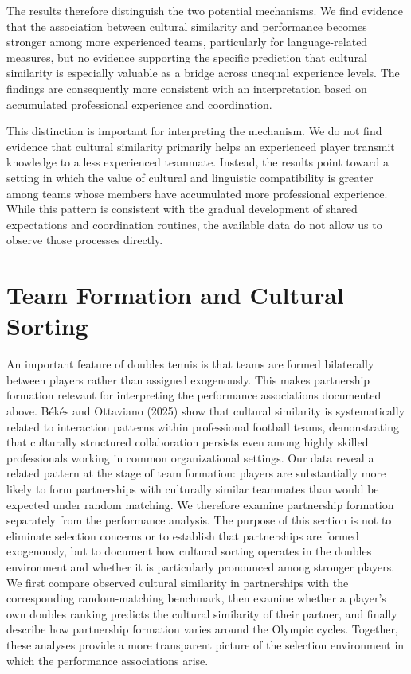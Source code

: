 \documentclass[10pt]{article}
\begin{document}
The results therefore distinguish the two potential mechanisms. We find evidence that the association between cultural similarity and performance becomes stronger among more experienced teams, particularly for language-related measures, but no evidence supporting the specific prediction that cultural similarity is especially valuable as a bridge across unequal experience levels. The findings are consequently more consistent with an interpretation based on accumulated professional experience and coordination.

This distinction is important for interpreting the mechanism. We do not find evidence that cultural similarity primarily helps an experienced player transmit knowledge to a less experienced teammate. Instead, the results point toward a setting in which the value of cultural and linguistic compatibility is greater among teams whose members have accumulated more professional experience. While this pattern is consistent with the gradual development of shared expectations and coordination routines, the available data do not allow us to observe those processes directly.



\section{Team Formation and Cultural Sorting}
An important feature of doubles tennis is that teams are formed bilaterally between players rather than assigned exogenously. This makes partnership formation relevant for interpreting the performance associations documented above. Békés and Ottaviano (2025) show that cultural similarity is systematically related to interaction patterns within professional football teams, demonstrating that culturally structured collaboration persists even among highly skilled professionals working in common organizational settings. Our data reveal a related pattern at the stage of team formation: players are substantially more likely to form partnerships with culturally similar teammates than would be expected under random matching. We therefore examine partnership formation separately from the performance analysis. The purpose of this section is not to eliminate selection concerns or to establish that partnerships are formed exogenously, but to document how cultural sorting operates in the doubles environment and whether it is particularly pronounced among stronger players. We first compare observed cultural similarity in partnerships with the corresponding random-matching benchmark, then examine whether a player's own doubles ranking predicts the cultural similarity of their partner, and finally describe how partnership formation varies around the Olympic cycles. Together, these analyses provide a more transparent picture of the selection environment in which the performance associations arise.
\end{document}
